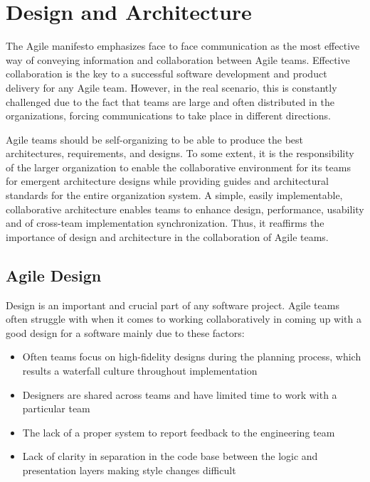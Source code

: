 \documentclass[sigplan,screen]{acmart}
\begin{document}
\section{Design and Architecture}
The Agile manifesto emphasizes face to face communication as the most effective way of conveying information and collaboration between Agile teams. Effective collaboration is the key to a successful software development and product delivery for any Agile team. However, in the real scenario, this is constantly challenged due to the fact that teams are large and often distributed in the organizations, forcing communications to take place in different directions.
\par
Agile teams should be self-organizing to be able to produce the best architectures, requirements, and designs. To some extent, it is the responsibility of the larger organization to enable the collaborative environment for its teams for emergent architecture designs while providing guides and architectural standards for the entire organization system. A simple, easily implementable, collaborative architecture enables teams to enhance design, performance, usability and of cross-team implementation synchronization. Thus, it reaffirms the importance of design and architecture in the collaboration of Agile teams.

\subsection{Agile Design}
Design is an important and crucial part of any software project. Agile teams often struggle with when it comes to working collaboratively in coming up with a good design for a software mainly due to these factors:
\begin{itemize}
    \item Often teams focus on high-fidelity designs during the planning process, which results a waterfall culture throughout implementation
    \item Designers are shared across teams and have limited time to work with a particular team
    \item The lack of a proper system to report feedback to the engineering team
    \item Lack of clarity in separation in the code base between the logic and presentation layers making style changes difficult
\end{itemize}
\end{document}
